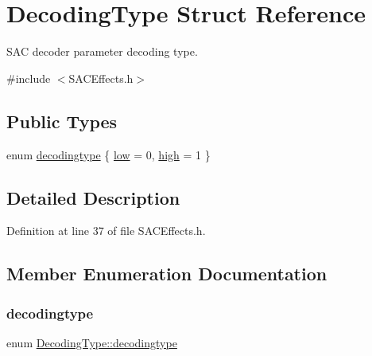 \hypertarget{struct_decoding_type}{}\section{Decoding\+Type Struct Reference}
\label{struct_decoding_type}


S\+AC decoder parameter decoding type.  




{\ttfamily \#include $<$S\+A\+C\+Effects.\+h$>$}

\subsection*{Public Types}
\begin{DoxyCompactItemize}
\item 
enum \hyperlink{struct_decoding_type_a8b3854652406458753c9b7da2068b822}{decodingtype} \{ \hyperlink{struct_decoding_type_a8b3854652406458753c9b7da2068b822a1c83062a65b39a734cfb6393fa679425}{low} = 0, 
\hyperlink{struct_decoding_type_a8b3854652406458753c9b7da2068b822a6184aedf8f82a070f5c054ead79d4d30}{high} = 1
 \}
\end{DoxyCompactItemize}


\subsection{Detailed Description}


Definition at line 37 of file S\+A\+C\+Effects.\+h.



\subsection{Member Enumeration Documentation}
\mbox{\label{struct_decoding_type_a8b3854652406458753c9b7da2068b822}} 
\subsubsection{\texorpdfstring{decodingtype}{decodingtype}}
{\footnotesize\ttfamily enum \hyperlink{struct_decoding_type_a8b3854652406458753c9b7da2068b822}{Decoding\+Type\+::decodingtype}}

